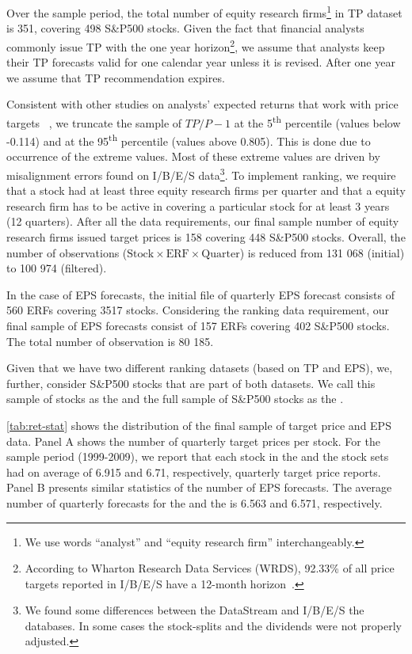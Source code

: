 \documentclass[a4paper,twoside,12pt,openright,notitlepage]{report}\usepackage[]{graphicx}\usepackage[]{color}
\begin{document}
Over the sample period, the total number of equity research firms\footnote{We use words ``analyst'' and ``equity research firm'' interchangeably.} in TP dataset is 351, covering 498 S\&P500 stocks. Given the fact that financial analysts commonly issue TP with the one year horizon\footnote{According to Wharton Research Data Services (WRDS), 92.33\% of all price targets reported in I/B/E/S have a 12-month horizon~\citep{glushkov2009}.}, we assume that analysts keep their TP forecasts valid for one calendar year unless it is revised. After one year we assume that TP recommendation expires.

Consistent with other studies on analysts' expected returns that work with price targets ~\citep{bradshaw2002,brav2003,da2011}, we truncate the sample of $TP/P-1$ at the 5\textsuperscript{th} percentile (values below -0.114) and at the 95\textsuperscript{th} percentile (values above 0.805). This is done due to occurrence of the extreme values. Most of these extreme values are driven by misalignment errors found on I/B/E/S data\footnote{We found some differences between the  DataStream and I/B/E/S the databases. In some cases the stock-splits and the dividends were not properly adjusted.}. To implement ranking, we require that a stock had at least three equity research firms per quarter and that a equity research firm has to be active in covering a particular stock for at least 3 years (12 quarters). After all the  data requirements, our final sample number of equity research firms issued target prices is 158 covering 448 S\&P500 stocks. Overall, the number of observations ($\mathrm{Stock} \times \mathrm{ERF} \times  \mathrm{Quarter}$) is reduced  from 131 068 (initial) to 100 974 (filtered).

In the case of EPS forecasts, the initial file of quarterly EPS forecast consists of 560 ERFs covering 3517 stocks. Considering the ranking data requirement, our final sample of EPS forecasts consist of  157 ERFs covering 402 S\&P500 stocks. The total number of observation is 80 185.


Given that we have two different ranking datasets (based on TP and EPS), we, further, consider S\&P500 stocks that are part of both datasets. We call this sample of stocks as the \same{} and the full sample of S\&P500 stocks as the \all{}.

\ref{tab:ret-stat} shows the distribution of the final sample of target price and EPS data. Panel A shows the number of quarterly target prices per stock. For the sample period (1999-2009), we report that each stock in the \same{} and the \all{} stock sets had on average of 6.915 and 6.71, respectively, quarterly target price reports. Panel B  presents similar statistics of the number of EPS forecasts. The average number of quarterly forecasts for the  \same{} and the \all{} is 6.563 and 6.571, respectively.
\end{document}
